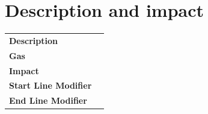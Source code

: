 \documentclass[a4paper,10pt]{article}
\newcommand{\descriptionChange}{}
\newcommand{\gasSaving}{}
\newcommand{\impact}{}
\newcommand{\startLineModifierChange}{}
\newcommand{\endLineModifierChange}{}
\begin{document}
\section{Description and impact}
\begin{tabular}{p{} p{}}
\textbf{Description}            & \descriptionChange \\
\vspace{0,05cm}
\textbf{Gas}                    & \gasSaving \\
\vspace{0,05cm}
\textbf{Impact}                 & \impact \\
\vspace{0,05cm}
\textbf{Start Line Modifier}    & \startLineModifierChange \\
\vspace{0,05cm}
\textbf{End Line Modifier}      & \endLineModifierChange \\
\end{tabular}
\bigskip
\end{document}

